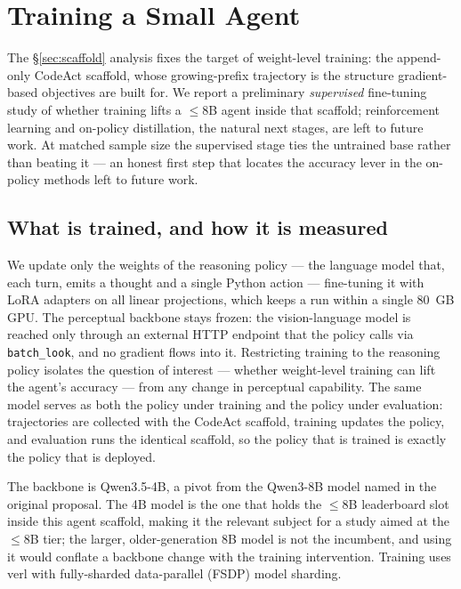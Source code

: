 \section{Training a Small Agent}
\label{sec:training}

The \S\ref{sec:scaffold} analysis fixes the target of weight-level training: the append-only CodeAct scaffold, whose growing-prefix trajectory is the structure gradient-based objectives are built for. We report a preliminary \emph{supervised} fine-tuning study of whether training lifts a $\leq$8B agent inside that scaffold; reinforcement learning and on-policy distillation, the natural next stages, are left to future work. At matched sample size the supervised stage ties the untrained base rather than beating it --- an honest first step that locates the accuracy lever in the on-policy methods left to future work.

\subsection{What is trained, and how it is measured}

We update only the weights of the reasoning policy --- the language model that, each turn, emits a thought and a single Python action --- fine-tuning it with LoRA adapters \citep{lora} on all linear projections, which keeps a run within a single 80~GB GPU. The perceptual backbone stays frozen: the vision-language model is reached only through an external HTTP endpoint that the policy calls via \texttt{batch\_look}, and no gradient flows into it. Restricting training to the reasoning policy isolates the question of interest --- whether weight-level training can lift the agent's accuracy --- from any change in perceptual capability. The same model serves as both the policy under training and the policy under evaluation: trajectories are collected with the CodeAct scaffold, training updates the policy, and evaluation runs the identical scaffold, so the policy that is trained is exactly the policy that is deployed.

The backbone is Qwen3.5-4B, a pivot from the Qwen3-8B model named in the original proposal. The 4B model is the one that holds the $\leq$8B leaderboard slot inside this agent scaffold, making it the relevant subject for a study aimed at the $\leq$8B tier; the larger, older-generation 8B model is not the incumbent, and using it would conflate a backbone change with the training intervention. Training uses verl \citep{verl} with fully-sharded data-parallel (FSDP) model sharding.

